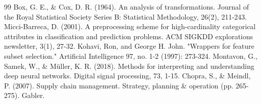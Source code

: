 \documentclass{ctexart}
\begin{document}
\begin{thebibliography}{99}
Box, G. E., \& Cox, D. R. (1964). An analysis of transformations. Journal of the Royal Statistical Society Series B: Statistical Methodology, 26(2), 211-243.
Micci-Barreca, D. (2001). A preprocessing scheme for high-cardinality categorical attributes in classification and prediction problems. ACM SIGKDD explorations newsletter, 3(1), 27-32.
Kohavi, Ron, and George H. John. "Wrappers for feature subset selection." Artificial Intelligence 97, no. 1-2 (1997): 273-324.
Montavon, G., Samek, W., \& Müller, K. R. (2018). Methods for interpreting and understanding deep neural networks. Digital signal processing, 73, 1-15.
Chopra, S., \& Meindl, P. (2007). Supply chain management. Strategy, planning \& operation (pp. 265-275). Gabler.

\end{thebibliography}
\end{document}
